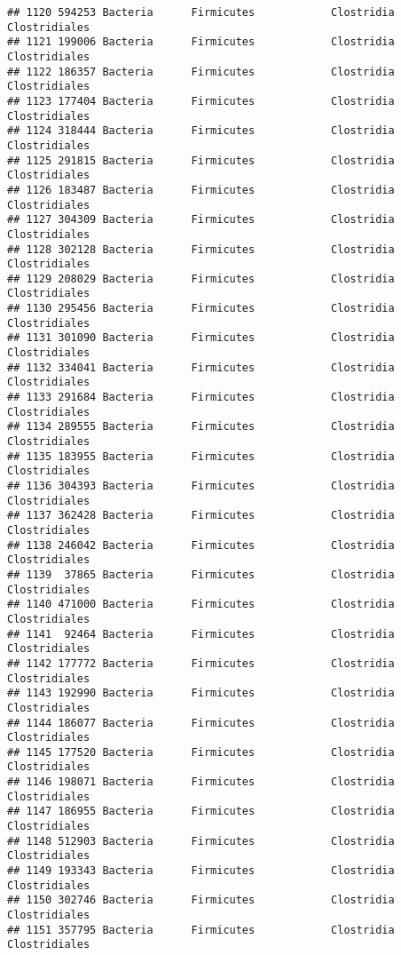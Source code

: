 \documentclass[
]{article}
\begin{document}
\begin{verbatim}
## 1120 594253 Bacteria      Firmicutes            Clostridia       Clostridiales
## 1121 199006 Bacteria      Firmicutes            Clostridia       Clostridiales
## 1122 186357 Bacteria      Firmicutes            Clostridia       Clostridiales
## 1123 177404 Bacteria      Firmicutes            Clostridia       Clostridiales
## 1124 318444 Bacteria      Firmicutes            Clostridia       Clostridiales
## 1125 291815 Bacteria      Firmicutes            Clostridia       Clostridiales
## 1126 183487 Bacteria      Firmicutes            Clostridia       Clostridiales
## 1127 304309 Bacteria      Firmicutes            Clostridia       Clostridiales
## 1128 302128 Bacteria      Firmicutes            Clostridia       Clostridiales
## 1129 208029 Bacteria      Firmicutes            Clostridia       Clostridiales
## 1130 295456 Bacteria      Firmicutes            Clostridia       Clostridiales
## 1131 301090 Bacteria      Firmicutes            Clostridia       Clostridiales
## 1132 334041 Bacteria      Firmicutes            Clostridia       Clostridiales
## 1133 291684 Bacteria      Firmicutes            Clostridia       Clostridiales
## 1134 289555 Bacteria      Firmicutes            Clostridia       Clostridiales
## 1135 183955 Bacteria      Firmicutes            Clostridia       Clostridiales
## 1136 304393 Bacteria      Firmicutes            Clostridia       Clostridiales
## 1137 362428 Bacteria      Firmicutes            Clostridia       Clostridiales
## 1138 246042 Bacteria      Firmicutes            Clostridia       Clostridiales
## 1139  37865 Bacteria      Firmicutes            Clostridia       Clostridiales
## 1140 471000 Bacteria      Firmicutes            Clostridia       Clostridiales
## 1141  92464 Bacteria      Firmicutes            Clostridia       Clostridiales
## 1142 177772 Bacteria      Firmicutes            Clostridia       Clostridiales
## 1143 192990 Bacteria      Firmicutes            Clostridia       Clostridiales
## 1144 186077 Bacteria      Firmicutes            Clostridia       Clostridiales
## 1145 177520 Bacteria      Firmicutes            Clostridia       Clostridiales
## 1146 198071 Bacteria      Firmicutes            Clostridia       Clostridiales
## 1147 186955 Bacteria      Firmicutes            Clostridia       Clostridiales
## 1148 512903 Bacteria      Firmicutes            Clostridia       Clostridiales
## 1149 193343 Bacteria      Firmicutes            Clostridia       Clostridiales
## 1150 302746 Bacteria      Firmicutes            Clostridia       Clostridiales
## 1151 357795 Bacteria      Firmicutes            Clostridia       Clostridiales

\end{verbatim}
\end{document}

